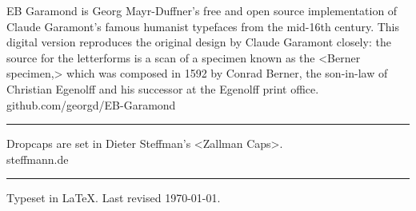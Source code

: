 \documentclass[
a5paper,
]{scrbook} %
\begin{document}
EB Garamond is Georg Mayr-Duffner's free and open source implementation of Claude Garamont’s famous humanist typefaces from the mid-16th century. This digital version reproduces the original design by Claude Garamont closely: the source for the letterforms is a scan of a specimen known as the <Berner specimen,> which was composed in 1592 by Conrad Berner, the son-in-law of Christian Egenolff and his successor at the Egenolff print office. \\
github.com/georgd/EB-Garamond
\vfill
\rule{0.5\textwidth}{.4pt}
\vfill
Dropcaps are set in Dieter Steffman's <Zallman Caps>.\\steffmann.de
\vfill
\rule{0.5\textwidth}{.4pt}
\vfill
Typeset in \LaTeX{}. Last revised \today.
\thispagestyle{empty}
\end{document}
